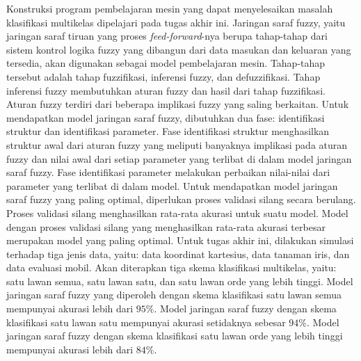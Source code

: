 \begin{Abstrak} %
Konstruksi program pembelajaran mesin yang dapat menyelesaikan masalah klasifikasi multikelas dipelajari pada tugas akhir ini. Jaringan saraf fuzzy, yaitu jaringan saraf tiruan yang proses \emph{feed-forward}-nya berupa tahap-tahap dari sistem kontrol logika fuzzy yang dibangun dari data masukan dan keluaran yang tersedia, akan digunakan sebagai model pembelajaran mesin. Tahap-tahap tersebut adalah tahap fuzzifikasi, inferensi fuzzy, dan defuzzifikasi. Tahap inferensi fuzzy membutuhkan aturan fuzzy dan hasil dari tahap fuzzifikasi. Aturan fuzzy terdiri dari beberapa implikasi fuzzy yang saling berkaitan. Untuk mendapatkan model jaringan saraf fuzzy, dibutuhkan dua fase: identifikasi struktur dan identifikasi parameter. Fase identifikasi struktur menghasilkan struktur awal dari aturan fuzzy yang meliputi banyaknya implikasi pada aturan fuzzy dan nilai awal dari setiap parameter yang terlibat di dalam model jaringan saraf fuzzy. Fase identifikasi parameter melakukan perbaikan nilai-nilai dari parameter yang terlibat di dalam model. Untuk mendapatkan model jaringan saraf fuzzy yang paling optimal, diperlukan proses validasi silang secara berulang. Proses validasi silang menghasilkan rata-rata akurasi untuk suatu model. Model dengan proses validasi silang yang menghasilkan rata-rata akurasi terbesar merupakan model yang paling optimal. Untuk tugas akhir ini, dilakukan simulasi terhadap tiga jenis data, yaitu: data koordinat kartesius, data tanaman iris, dan data evaluasi mobil. Akan diterapkan tiga skema klasifikasi multikelas, yaitu: satu lawan semua, satu lawan satu, dan satu lawan orde yang lebih tinggi. Model jaringan saraf fuzzy yang diperoleh dengan skema klasifikasi satu lawan semua mempunyai akurasi lebih dari $95\%$. Model jaringan saraf fuzzy dengan skema klasifikasi satu lawan satu mempunyai akurasi setidaknya sebesar $94\%$. Model jaringan saraf fuzzy dengan skema klasifikasi satu lawan orde yang lebih tinggi mempunyai akurasi lebih dari $84\%$.

\end{Abstrak}
